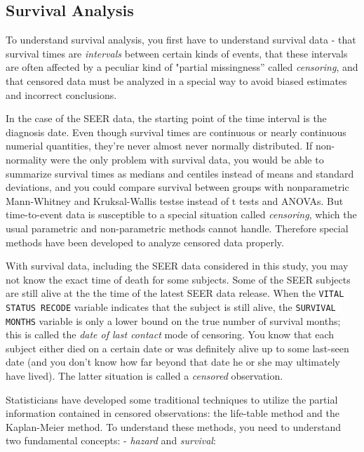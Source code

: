 \documentclass[a4paper,11pt]{article}
\newcommand{\codewhite}[1]{\colorbox{white}{\texttt{#1}}}
\begin{document}

\subsection{Survival Analysis}
\label{subsec:survprimer}


To understand survival analysis, you first have to understand survival data - that survival times are \textit{intervals} between certain kinds of events, that these intervals are often affected by a peculiar kind of "partial missingness'' called \textit{censoring}, and that censored data must be analyzed in a special way to avoid biased estimates and incorrect conclusions.

In the case of the SEER data, the starting point of the time interval is the diagnosis date. Even though survival times are continuous or nearly continuous numerial quantities, they're never almost never normally distributed. If non-normality were the only problem with survival data, you would be able to summarize survival times as medians and centiles instead of means and standard deviations, and you could compare survival between groups with nonparametric Mann-Whitney and Kruksal-Wallis testse instead of t tests and ANOVAs. But time-to-event data is susceptible to a special situation called \textit{censoring}, which the usual parametric and non-parametric methods cannot handle. Therefore special methods have been developed to analyze censored data properly. 

With survival data, including the SEER data considered in this study, you may not know the exact time of death for some subjects. Some of the SEER subjects are still alive at the the time of the latest SEER data release. When the \codewhite{VITAL STATUS RECODE} variable indicates that the subject is still alive, the \codewhite{SURVIVAL MONTHS} variable is only a lower bound on the true number of survival months; this is called the \textit{date of last contact} mode of censoring. You know that each subject either died on a certain date or was definitely alive up to some last-seen date (and you don't know how far beyond that date he or she may ultimately have lived). The latter situation is called a \textit{censored} observation. 

Statisticians have developed some traditional techniques to utilize the partial information contained in censored observations: the life-table method and the Kaplan-Meier method. To understand these methods, you need to understand two fundamental concepts: - \textit{hazard} and \textit{survival}:
\end{document}
